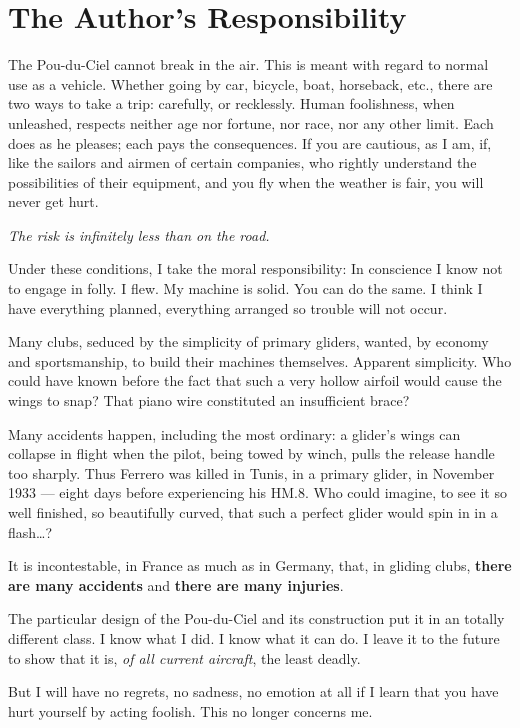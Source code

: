\documentclass{book}
\begin{document}
\section{The Author's Responsibility}

The Pou-du-Ciel cannot break in the air. This is meant with regard to
normal use as a vehicle. Whether going by car, bicycle, boat,
horseback, etc., there are two ways to take a trip: carefully, or
recklessly.  Human foolishness, when unleashed, respects neither age
nor fortune, nor race, nor any other limit. Each does as he pleases;
each pays the consequences.  If you are cautious, as I am, if, like
the sailors and airmen of certain companies, who rightly understand
the possibilities of their equipment, and you fly when the weather is
fair, you will never get hurt.

\textit{The risk is infinitely less than on the road.}

Under these conditions, I take the moral responsibility: In conscience
I know not to engage in folly. I flew. My machine is solid. You can do
the same. I think I have everything planned, everything arranged so
trouble will not occur.

Many clubs, seduced by the simplicity of primary gliders, wanted, by
economy and sportsmanship, to build their machines themselves.
Apparent simplicity. Who could have known before the fact that such a
very hollow airfoil would cause the wings to snap?  That piano wire
constituted an insufficient brace?

Many accidents happen, including the most ordinary: a glider's wings
can collapse in flight when the pilot, being towed by winch, pulls the
release handle too sharply.  Thus Ferrero was killed in Tunis, in a
primary glider, in November 1933 --- eight days before experiencing
his HM.8.  Who could imagine, to see it so well finished, so
beautifully curved, that such a perfect glider would spin in in a
flash\ldots?

It is incontestable, in France as much as in Germany, that, in gliding
clubs, \textbf{there are many accidents} and \textbf{there are many
  injuries}.

The particular design of the Pou-du-Ciel and its construction put it
in an totally different class. I know what I did. I know what it can
do. I leave it to the future to show that it is, \textit{of all
  current aircraft}, the least deadly.

But I will have no regrets, no sadness, no emotion at all if I learn
that you have hurt yourself by acting foolish. This no longer concerns
me.
\end{document}
